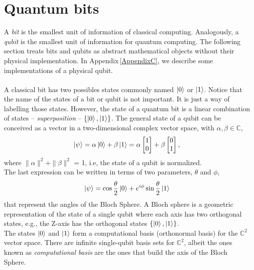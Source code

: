 \section{Quantum bits}
A \textit{bit} is the smallest unit of information of classical computing. Analogously, a \textit{qubit} is the smallest unit of information for quantum computing. The following section treats bits and qubits as abstract mathematical objects without their physical implementation. In Appendix\,\ref{AppendixC}, we describe some implementations of a physical qubit.\\\\
A classical bit has two possibles states commonly named $\ket{0}$ or $\ket{1}$. Notice that the name of the states of a bit or qubit is not important. It is just a way of labelling those states. However, the state of a quantum bit is a linear combination of states -- \textit{superposition} -- $\{\ket{0}, \ket{1}\}$. The general state of a qubit can be conceived as a vector in a two-dimensional complex vector space, with $\alpha, \beta \in \mathbb{C}$,
\begin{equation}
    \ket{\psi} = \alpha \ket{0} + \beta \ket{1} = \alpha \begin{bmatrix}
           1 \\
           0 
         \end{bmatrix}
         +
         \beta
         \begin{bmatrix}
           0 \\
           1 
         \end{bmatrix},
\end{equation}
where $\|\alpha\|^{2} + \|\beta\|^{2}$ = 1, i.e, the state of a qubit is normalized.\\
The last expression can be written in terms of two parameters, $\theta$ and $\phi$,
\begin{equation}
    \ket{\psi} = \cos{\frac{\theta}{2}}\ket{0} + e^{i\phi}\sin{\frac{\theta}{2}}\ket{1}
\end{equation}
that represent the angles of the Bloch Sphere. A Bloch sphere is a geometric representation of the state of a single qubit where each axis has two orthogonal states, e.g., the Z-axis has the orthogonal states $\{\ket{0},\ket{1}\}$.\\
The states $\ket{0}$ and $\ket{1}$ form a computational basis (orthonormal basis) for the $\mathbb{C}^{2}$ vector space. There are infinite single-qubit basis sets for $\mathbb{C}^{2}$, albeit the ones known as \textit{computational basis} are the ones that build the axis of the Bloch Sphere.
